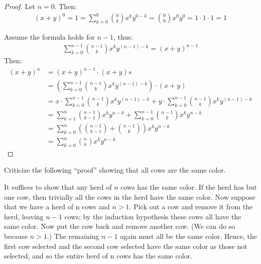 \begin{proof}
    Let $n = 0$. Then:
    \begin{align*}
        {(x + y)}^0 = 1 = \sum_{k = 0}^{0} \binom{0}{k} x^k y^{0-k} = \binom{0}{0} x^0 y^0 = 1 \cdot 1 \cdot 1 = 1
    \end{align*}

    Assume the formula holds for $n - 1$, thus:
    \begin{align*}
        \sum_{k = 0}^{n - 1} \binom{n - 1}{k} x^k y^{(n-1)-k} = (x+y)^{n - 1}
    \end{align*}
    Then:
    \begin{align*}
        {(x+y)}^n & = {(x+y)}^{n - 1} \cdot (x + y)  s                                                                                              \\
                  & = \left(\sum_{k = 0}^{n - 1} \binom{n - 1}{k} x^k y^{(n-1)-k}\right) \cdot (x + y)                                              \\
                  & = x \cdot \sum_{k = 0}^{n - 1} \binom{n - 1}{k} x^k y^{(n-1)-k} + y \cdot \sum_{k = 0}^{n - 1} \binom{n - 1}{k} x^k y^{(n-1)-k} \\
                  & = \sum_{k = 1}^{n} \binom{n - 1}{k - 1} x^k y^{n - k} + \sum_{k = 0}^{n - 1} \binom{n - 1}{k} x^k y^{n - k}                     \\
                  & = \sum_{k = 0}^{n} \left( \binom{n - 1}{k - 1} + \binom{n - 1}{k} \right) x^k y^{n - k}                                         \\
                  & = \sum_{k = 0}^{n} \binom{n}{k} x^k y^{n - k}
    \end{align*}
\end{proof}

\begin{tcolorbox}[title=Problem 15, breakable]
    Criticize the following ``proof'' showing that all cows are the same
    color.

    It suffices to show that any herd of $n$ cows has the same color. If the herd
    has but one cow, then trivially all the cows in the herd have the same color.
    Now suppose that we have a herd of n cows and $n > 1$. Pick out a cow and
    remove it from the herd, leaving $n - 1$ cows; by the induction hypothesis
    these cows all have the same color. Now put the cow back and remove another
    cow. (We can do so because $n > 1$.) The remaining $n - 1$ again must all be
    the same color. Hence, the first cow selected and the second cow selected have
    the same color as those not selected, and so the entire herd of n cows has the
    same color.
\end{tcolorbox}

